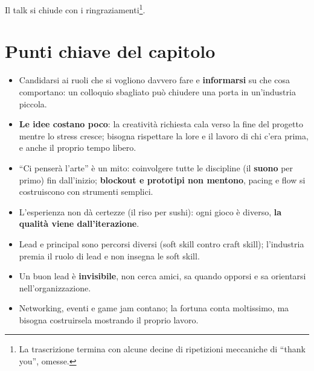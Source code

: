 Il talk si chiude con i ringraziamenti\footnote{La trascrizione termina con
alcune decine di ripetizioni meccaniche di ``thank you'', omesse.}.

\section*{Punti chiave del capitolo}

\begin{itemize}
  \item Candidarsi ai ruoli che si vogliono davvero fare e \textbf{informarsi} su
        che cosa comportano: un colloquio sbagliato può chiudere una porta in
        un'industria piccola.
  \item \textbf{Le idee costano poco}: la creatività richiesta cala verso la fine
        del progetto mentre lo stress cresce; bisogna rispettare la lore e il
        lavoro di chi c'era prima, e anche il proprio tempo libero.
  \item ``Ci penserà l'arte'' è un mito: coinvolgere tutte le discipline (il
        \textbf{suono} per primo) fin dall'inizio; \textbf{blockout e prototipi non
        mentono}, pacing e flow si costruiscono con strumenti semplici.
  \item L'esperienza non dà certezze (il riso per sushi): ogni gioco è diverso,
        \textbf{la qualità viene dall'iterazione}.
  \item Lead e principal sono percorsi diversi (soft skill contro craft skill);
        l'industria premia il ruolo di lead e non insegna le soft skill.
  \item Un buon lead è \textbf{invisibile}, non cerca amici, sa quando opporsi e
        sa orientarsi nell'organizzazione.
  \item Networking, eventi e game jam contano; la fortuna conta moltissimo, ma
        bisogna costruirsela mostrando il proprio lavoro.
\end{itemize}
